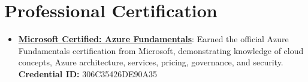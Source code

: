 \documentclass[a4paper,20pt]{article}
\newcommand{\resumeItem}[2]{
  \item\small{
    \textbf{#1}{: #2 \vspace{-2pt}}
  }
}
\newcommand{\resumeSubItem}[2]{\resumeItem{#1}{#2}\vspace{-3pt}}
\newcommand{\resumeSubHeadingListStart}{\begin{itemize}[leftmargin=*]}
\newcommand{\resumeSubHeadingListEnd}{\end{itemize}}
\begin{document}
\vspace{-5pt}
\section{Professional Certification}
  \resumeSubHeadingListStart
	\resumeSubItem{\href{https://learn.microsoft.com/en-us/users/ambikakashyap-3215/credentials/certification/azure-fundamentals?tab=credentials-tab}{Microsoft Certified: Azure Fundamentals}}%
{Earned the official Azure Fundamentals certification from Microsoft, demonstrating knowledge of cloud concepts, Azure architecture, services, pricing, governance, and security. \vspace{2pt}
\textbf
{Credential ID:} 306C35426DE90A35}

\resumeSubHeadingListEnd
\end{document}
